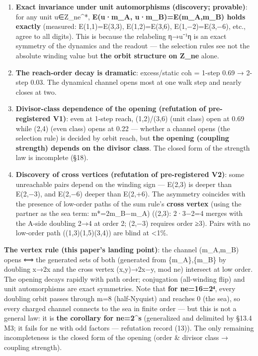 \documentclass[
]{article}
\providecommand{\tightlist}{%
  \setlength{\itemsep}{0pt}\setlength{\parskip}{0pt}}
\begin{document}
\begin{enumerate}
\def\labelenumi{\arabic{enumi}.}
\tightlist
\item
  \textbf{Exact invariance under unit automorphisms (discovery;
  provable)}: for any unit u∈Z\_ne\^{}*, \textbf{E(u·m\_A,
  u·m\_B)=E(m\_A,m\_B) holds exactly} (measured: E(1,1)=E(3,3),
  E(1,2)=E(3,6), E(1,−2)=E(3,−6), etc., agree to all digits). This is
  because the relabeling η→u⁻¹η is an exact symmetry of the dynamics and
  the readout --- the selection rules see not the absolute winding value
  but \textbf{the orbit structure on Z\_ne} alone.
\item
  \textbf{The reach-order decay is dramatic}: excess/static coh = 1-step
  0.69 → 2-step 0.03. The dynamical channel opens most at one walk step
  and nearly closes at two.
\item
  \textbf{Divisor-class dependence of the opening (refutation of
  pre-registered V1)}: even at 1-step reach, (1,2)/(3,6) (unit class)
  open at 0.69 while (2,4) (even class) opens at 0.22 --- whether a
  channel opens (the selection rule) is decided by orbit reach, but
  \textbf{the opening (coupling strength) depends on the divisor class}.
  The closed form of the strength law is incomplete (§18).
\item
  \textbf{Discovery of cross vertices (refutation of pre-registered
  V2)}: some unreachable pairs depend on the winding sign --- E(2,3) is
  deeper than E(2,−3), and E(2,−6) deeper than E(2,+6). The asymmetry
  coincides with the presence of low-order paths of the sum rule's
  \textbf{cross vertex} (using the partner as the sea term:
  m*=2m\_B−m\_A) ((2,3): 2·3−2=4 merges with the A-side doubling 2→4 at
  order 2; (2,−3) requires order ≥3). Pairs with no low-order path
  ((1,3)(1,5)(3,4)) are blind at \textless1\%.
\end{enumerate}

\textbf{The vertex rule (this paper's landing point)}: the channel
(m\_A,m\_B) opens ⟺ the generated sets of both (generated from
\{m\_A\},\{m\_B\} by doubling x→2x and the cross vertex (x,y)→2x−y, mod
ne) intersect at low order. The opening decays rapidly with path order;
conjugation (all-winding flip) and unit automorphisms are exact
symmetries. Note that \textbf{for ne=16=2⁴}, every doubling orbit passes
through m=8 (half-Nyquist) and reaches 0 (the sea), so every charged
channel connects to the sea in finite order --- but this is not a
general law: it is \textbf{the corollary for ne=2\^{}s} (generalized and
delimited by §13.4 M3; it fails for ne with odd factors --- refutation
record (13)). The only remaining incompleteness is the closed form of
the opening (order \& divisor class → coupling strength).
\end{document}
